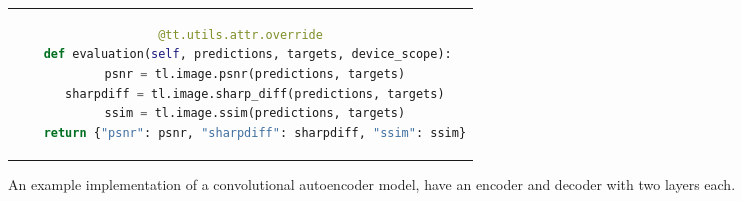 \begin{figure}[h!tb]
\begin{tabular}{c}
\begin{lstlisting}[language=Python]
  @tt.utils.attr.override
  def evaluation(self, predictions, targets, device_scope):
    psnr = tl.image.psnr(predictions, targets)
    sharpdiff = tl.image.sharp_diff(predictions, targets)
    ssim = tl.image.ssim(predictions, targets)
    return {"psnr": psnr, "sharpdiff": sharpdiff, "ssim": ssim}
  \end{lstlisting}
  \end{tabular}
  \caption[Listing: Convolutional Autoencoder]{An example implementation of a convolutional autoencoder model, have an encoder and decoder with two layers each.}\label{code:model}
\end{figure}





